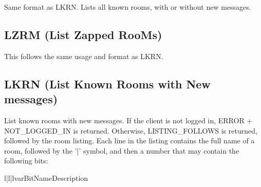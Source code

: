  Same format as LKRN.  Lists all known rooms, with or without new messages.



\subsection{LZRM (List Zapped RooMs)}

 This follows the same usage and format as LKRN.



\subsection{LKRN (List Known Rooms with New messages)}

 List known rooms with new messages.  If the client is not logged in, ERROR +
NOT_LOGGED_IN is returned.  Otherwise, LISTING_FOLLOWS is returned, followed
by the room listing.  Each line in the listing contains the full name of a
room, followed by the '|' symbol, and then a number that may contain the
following bits:

\begin{tableiii}{l|l|l}{var}{Bit}{Name}{Description}















\end{tableiii}

